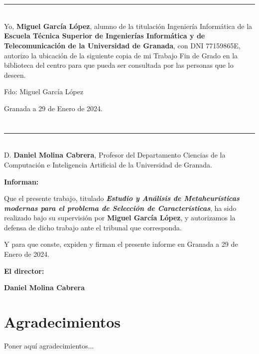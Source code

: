 \chapter*{}
\thispagestyle{empty}

\noindent\rule[-1ex]{\textwidth}{2pt}\\[4.5ex]

Yo, \textbf{Miguel García López}, alumno de la titulación Ingeniería Informática de la \textbf{Escuela Técnica Superior
       de Ingenierías Informática y de Telecomunicación de la Universidad de Granada}, con DNI 77159865E, autorizo la
ubicación de la siguiente copia de mi Trabajo Fin de Grado en la biblioteca del centro para que pueda ser
consultada por las personas que lo deseen.

\vspace{6cm}

\noindent Fdo: Miguel García López

\vspace{2cm}

\begin{flushright}
       Granada a 29 de Enero de 2024.
\end{flushright}


\chapter*{}
\thispagestyle{empty}

\noindent\rule[-1ex]{\textwidth}{2pt}\\[4.5ex]

D. \textbf{Daniel Molina Cabrera}, Profesor del Departamento Ciencias de la Computación e Inteligencia Artificial de la Universidad de Granada.

\vspace{0.5cm}
\textbf{Informan:}

\vspace{0.5cm}

Que el presente trabajo, titulado \textit{\textbf{Estudio y Análisis de Metaheurísticas modernas para el problema de Selección de Características}},
ha sido realizado bajo su supervisión por \textbf{Miguel García López}, y autorizamos la defensa de dicho trabajo ante el tribunal
que corresponda.

\vspace{0.5cm}

Y para que conste, expiden y firman el presente informe en Granada a 29 de Enero de 2024.

\vspace{1cm}

\textbf{El director:}

\vspace{5cm}

\noindent \textbf{Daniel Molina Cabrera}

\chapter*{Agradecimientos}
\thispagestyle{empty}

\vspace{1cm}


Poner aquí agradecimientos...

